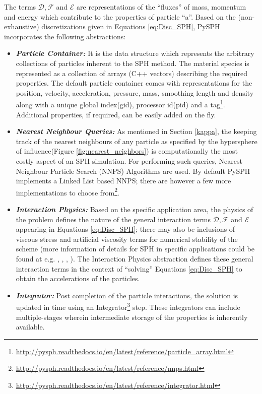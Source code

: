 The terms $\mathcal{D}, \mathcal{F}$ and $\mathcal{E}$ are representations of the ``fluxes'' of mass, momentum and energy which contribute to the properties of particle ``a''. Based on the (non-exhaustive) discretizations given in Equations \eqref{eq:Disc_SPH}, PySPH incorporates the following abstractions:

\begin{itemize}
\item \textbf{\textit{Particle Container: }}It is the data structure which represents the arbitrary collections of particles inherent to the SPH method. The material species is represented as a collection of arrays (C++ vectors) describing the required properties. The default particle container comes with representations for the position, velocity, acceleration, pressure, mass, smoothing length and density along with a unique global index(gid), processor id(pid) and a tag\footnote[4]{\url{http://pysph.readthedocs.io/en/latest/reference/particle_array.html}}. Additional properties, if required, can be easily added on the fly. 

\item \textbf{\textit{Nearest Neighbour Queries: }} As mentioned in Section \ref{kappa}, the keeping track of the nearest neighbours of any particle as specified by the hypersphere of influence(Figure \ref{fig:nearest_neighbors}) is computationally the most costly aspect of an SPH simulation. For performing such queries, Nearest Neighbour Particle Search (NNPS) Algorithms are used. By default PySPH implements a Linked List based NNPS; there are however a few more implementations to choose from\footnote[5]{\url{http://pysph.readthedocs.io/en/latest/reference/nnps.html}}.

\item \textbf{\textit{Interaction Physics: }}Based on the specific application area, the physics of the problem defines the nature of the general interaction terms  $\mathcal{D}, \mathcal{F}$ and $\mathcal{E}$ appearing in Equations \ref{eq:Disc_SPH}; there may also be inclusions of viscous stress and artificial viscosity terms for numerical stability of the scheme (more information of details for SPH in specific applications could be found at e.g. \cite{price}, \cite{monaghan_ARFM}, \cite{monaghan_physics},  \cite{volker_springel}). The Interaction Physics abstraction defines these general interaction terms in the context of ``solving'' Equations \ref{eq:Disc_SPH} to obtain the accelerations of the particles.

\item \textbf{\textit{Integrator: }}Post completion of the particle interactions, the solution is updated in time using an Integrator\footnote[6]{\url{http://pysph.readthedocs.io/en/latest/reference/integrator.html}} step. These integrators can include multiple-stages wherein intermediate storage of the properties is inherently available. 


\end{itemize}

